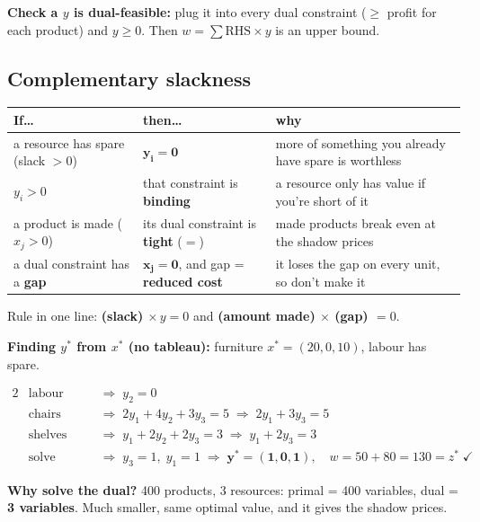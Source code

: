 \documentclass[10pt,a4paper]{article}
\newcommand{\thead}[1]{\textbf{#1}}
\begin{document}
\textbf{Check a $y$ is dual-feasible:} plug it into every dual constraint ($\geq$ profit for each product) and $y \geq 0$. Then $w = \sum \text{RHS} \times y$ is an upper bound.

\subsection{Complementary slackness}

\begin{tabularx}{\linewidth}{@{}l l L@{}}
\toprule
\thead{If\ldots} & \thead{then\ldots} & \thead{why} \\
\midrule
a resource has spare (slack $> 0$) & $\mathbf{y_i = 0}$ & more of something you already have spare is worthless \\
$y_i > 0$ & that constraint is \textbf{binding} & a resource only has value if you're short of it \\
a product is made ($x_j > 0$) & its dual constraint is \textbf{tight} ($=$) & made products break even at the shadow prices \\
a dual constraint has a \textbf{gap} & $\mathbf{x_j = 0}$, and gap = \textbf{reduced cost} & it loses the gap on every unit, so don't make it \\
\bottomrule
\end{tabularx}

Rule in one line: \textbf{(slack) $\times\, y = 0$} \; and \; \textbf{(amount made) $\times$ (gap) $= 0$}.

\textbf{Finding $y^*$ from $x^*$ (no tableau):} furniture $x^* = (20, 0, 10)$, labour has spare.
\begin{work}
\begin{alignat*}{2}
&\text{labour spare} &\quad&\Rightarrow\; y_2 = 0 \\
&\text{chairs made (tight)} &&\Rightarrow\; 2y_1 + 4y_2 + 3y_3 = 5 \;\Rightarrow\; 2y_1 + 3y_3 = 5 \\
&\text{shelves made (tight)} &&\Rightarrow\; y_1 + 2y_2 + 2y_3 = 3 \;\Rightarrow\; y_1 + 2y_3 = 3 \\
&\text{solve} &&\Rightarrow\; y_3 = 1,\; y_1 = 1 \;\Rightarrow\; \mathbf{y^* = (1, 0, 1)},\quad w = 50 + 80 = 130 = z^* \;\checkmark
\end{alignat*}
\end{work}

\textbf{Why solve the dual?} 400 products, 3 resources: primal = 400 variables, dual = \textbf{3 variables}. Much smaller, same optimal value, and it gives the shadow prices.
\end{document}
